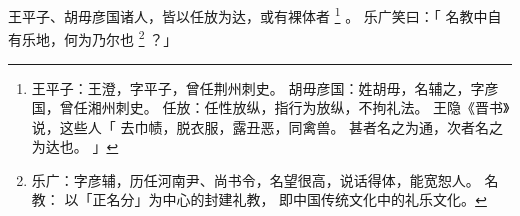 
\switchcolumn*[\section{}]

王平子、胡毋彦国诸人，皆以任放为达，或有裸体者%
\footnote{%
    王平子：王澄，字平子，曾任荆州刺史。
    胡毋彦国：姓胡毋，名辅之，字彦国，曾任湘州刺史。
    任放：任性放纵，指行为放纵，不拘礼法。
          王隐《晋书》说，这些人「
              去巾帻，脱衣服，露丑恶，同禽兽。
              甚者名之为通，次者名之为达也。
          」
}%
。
乐广笑曰：「
    名教中自有乐地，何为乃尔也%
    \footnote{%
        乐广：字彦辅，历任河南尹、尚书令，名望很高，说话得体，能宽恕人。
        名教：
            以「正名分」为中心的封建礼教，
            即中国传统文化中的礼乐文化。
    }%
？」

\switchcolumn



